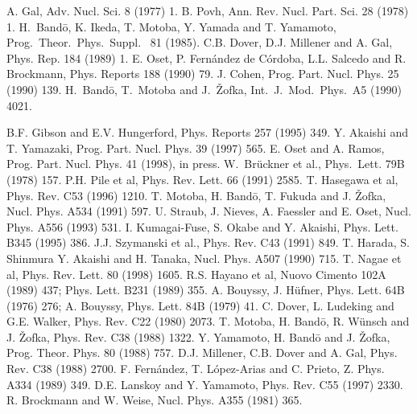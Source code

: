 \begin{references}

 A. Gal, Adv. Nucl. Sci. 8 (1977) 1.
 B. Povh, Ann. Rev. Nucl. Part. Sci. 28 (1978) 1.
H.\ Band\={o}, K. Ikeda, T. Motoba, Y. Yamada and T. Yamamoto, 
Prog.\ Theor.\ Phys.\ Suppl. \ 81 (1985). 
 C.B. Dover, D.J. Millener and A. Gal, Phys. 
Rep. 184 (1989) 1.
 E. Oset, P. Fern\'andez de C\'ordoba, L.L. Salcedo
and R. Brockmann, Phys. Reports 188 (1990) 79.
 J. Cohen, Prog. Part. Nucl. Phys. 25 (1990) 139.
 H.\ Band\={o}, T.\ Motoba and J.\ \v{Z}ofka, Int.\ J.\ Mod.\
Phys.\ A5 (1990) 4021.

 B.F. Gibson and E.V. Hungerford, Phys. Reports 257 (1995) 
349.
 Y. Akaishi and T. Yamazaki, Prog. Part. Nucl. Phys.
39 (1997) 565.
 E. Oset and A. Ramos, Prog. Part. Nucl. Phys. 41 (1998),
in press.
W.\ Br\"{u}ckner et al., Phys.\ Lett.  79B (1978) 157.
P.H. Pile et al, Phys. Rev. Lett. 66 (1991) 2585.
T. Hasegawa et al, Phys. Rev. C53 (1996) 1210.
T. Motoba, H. Band\={o}, T. Fukuda and J. \v{Z}ofka, Nucl. Phys. A534 
(1991) 597.
U. Straub, J. Nieves, A. Faessler and E. Oset, Nucl. Phys. A556
(1993) 531.
I. Kumagai-Fuse, S. Okabe and Y. Akaishi, Phys. Lett. B345 (1995) 386.
\bibitem{szyman91}
J.J. Szymanski et al., Phys. Rev. C43 (1991) 849.
T. Harada, S. Shinmura Y. Akaishi and H. Tanaka, Nucl. Phys. A507
(1990) 715.
T. Nagae et al, Phys. Rev. Lett. 80 (1998) 1605.
R.S. Hayano et al, Nuovo Cimento 102A (1989) 437; 
Phys. Lett. B231 (1989) 355.
A. Bouyssy, J. H\"{u}fner, Phys. Lett. 64B (1976) 276;
A. Bouyssy, Phys. Lett. 84B (1979) 41.
C. Dover, L. Ludeking and G.E. Walker, Phys. Rev. C22 (1980) 2073.
\bibitem{moto88}
T. Motoba, H. Band\={o}, R. W\"{u}nsch and J. \v{Z}ofka, Phys. Rev.
C38 (1988) 1322.
Y. Yamamoto, H. Band\={o} and J. \v{Z}ofka, Prog. Theor. Phys. 80
(1988) 757.
D.J. Millener, C.B. Dover and A. Gal, Phys. Rev. C38 (1988) 2700.
\bibitem{fernan89}
F. Fern\'andez, T. L\'opez-Arias and C. Prieto, Z. Phys. A334 (1989) 349.
\bibitem{lansk97}
D.E. Lanskoy and Y. Yamamoto, Phys. Rev. C55 (1997) 2330.
R. Brockmann and W. Weise, Nucl. Phys. A355 (1981) 365.

\end{references}
